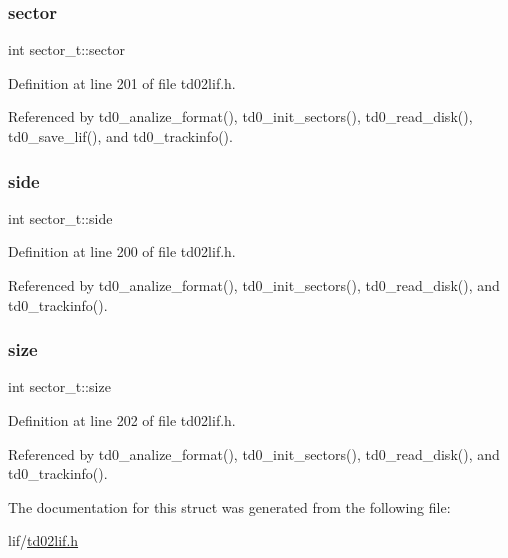 \mbox{\label{structsector__t_ac4920b9f7c5e2e9d67f3d2aca7a7191f}} 
\subsubsection{\texorpdfstring{sector}{sector}}
{\footnotesize\ttfamily int sector\+\_\+t\+::sector}



Definition at line 201 of file td02lif.\+h.



Referenced by td0\+\_\+analize\+\_\+format(), td0\+\_\+init\+\_\+sectors(), td0\+\_\+read\+\_\+disk(), td0\+\_\+save\+\_\+lif(), and td0\+\_\+trackinfo().

\mbox{\label{structsector__t_a78a5489776ec87f0146b56bf9ed69ee9}} 
\subsubsection{\texorpdfstring{side}{side}}
{\footnotesize\ttfamily int sector\+\_\+t\+::side}



Definition at line 200 of file td02lif.\+h.



Referenced by td0\+\_\+analize\+\_\+format(), td0\+\_\+init\+\_\+sectors(), td0\+\_\+read\+\_\+disk(), and td0\+\_\+trackinfo().

\mbox{\label{structsector__t_ab7886bbfbf6610a6324acbff76cd8fe0}} 
\subsubsection{\texorpdfstring{size}{size}}
{\footnotesize\ttfamily int sector\+\_\+t\+::size}



Definition at line 202 of file td02lif.\+h.



Referenced by td0\+\_\+analize\+\_\+format(), td0\+\_\+init\+\_\+sectors(), td0\+\_\+read\+\_\+disk(), and td0\+\_\+trackinfo().



The documentation for this struct was generated from the following file\+:\begin{DoxyCompactItemize}
\item 
lif/\hyperlink{td02lif_8h}{td02lif.\+h}\end{DoxyCompactItemize}
